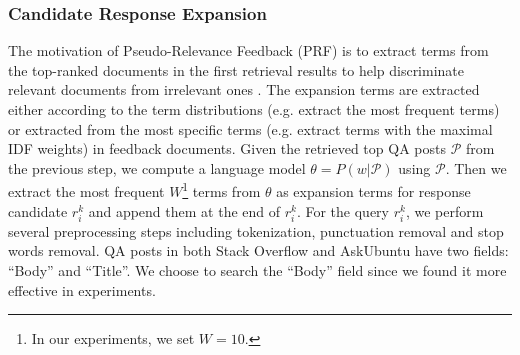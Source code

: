 \subsubsection{\textbf{Candidate Response Expansion}} %
\label{sec:response_expansion}
The motivation of Pseudo-Relevance Feedback (PRF) is to extract terms from the top-ranked documents in the first retrieval results to help discriminate relevant documents from irrelevant ones \cite{Cao:2008:SGE:1390334.1390377}. The expansion terms are extracted either according to the term distributions (e.g. extract the most frequent terms) or extracted from the most specific terms (e.g. extract terms with the maximal IDF weights) in feedback documents. Given the retrieved top QA posts $\mathcal{P}$ from the previous step, we compute a language model $\theta = P(w| \mathcal{P})$ using $\mathcal{P}$. Then we extract the most frequent $W$\footnote{In our experiments, we set $W = 10$. }  terms from $\theta$ as expansion terms for response candidate $r_i^k$ and append them at the end of $r_i^k$. For the query $r_i^k$, we perform several preprocessing steps including tokenization, punctuation removal and stop words removal.  QA posts in both Stack Overflow and AskUbuntu have two fields: ``Body'' and ``Title''. We choose to search the ``Body'' field since we found it more effective in experiments. 



